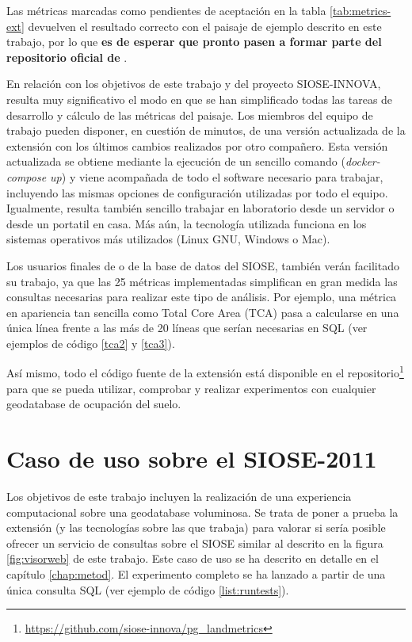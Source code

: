 Las métricas marcadas como pendientes de aceptación en la tabla \ref{tab:metrics-ext} devuelven el resultado correcto con el paisaje de ejemplo descrito en este trabajo, por lo que \textbf{es de esperar que pronto pasen a formar parte del repositorio oficial de \pgland{}}.

En relación con los objetivos de este trabajo y del proyecto SIOSE-INNOVA, resulta muy significativo el modo en que se han simplificado todas las tareas de desarrollo y cálculo de las métricas del paisaje. Los miembros del equipo de trabajo pueden disponer, en cuestión de minutos, de una versión actualizada de la extensión \pgland{} con los últimos cambios realizados por otro compañero. Esta versión actualizada se obtiene mediante la ejecución de un sencillo comando (\textit{docker-compose up}) y viene acompañada de todo el software necesario para trabajar, incluyendo las mismas opciones de configuración utilizadas por todo el equipo. Igualmente, resulta también sencillo trabajar en laboratorio desde un servidor o desde un portatil en casa. Más aún, la tecnología utilizada funciona en los sistemas operativos más utilizados (Linux GNU, Windows o Mac). 

Los usuarios finales de \pgland{} o de la base de datos del SIOSE, también verán facilitado su trabajo, ya que las 25 métricas implementadas simplifican en gran medida las consultas necesarias para realizar este tipo de análisis. Por ejemplo, una métrica en apariencia tan sencilla como Total Core Area (TCA) pasa a calcularse en una única línea frente a las más de 20 líneas que serían necesarias en SQL (ver ejemplos de código \ref{tca2} y \ref{tca3}).

Así mismo, todo el código fuente de la extensión \pgland{} está disponible en el repositorio\footnote{\url{https://github.com/siose-innova/pg_landmetrics}} para que se pueda utilizar, comprobar y realizar experimentos con cualquier geodatabase de ocupación del suelo.

\section{Caso de uso sobre el SIOSE-2011 \label{sec:caso_uso}}

Los objetivos de este trabajo incluyen la realización de una experiencia computacional sobre una geodatabase voluminosa. Se trata de poner a prueba la extensión \pgland{} (y las tecnologías sobre las que trabaja) para valorar si sería posible ofrecer un servicio de consultas sobre el SIOSE similar al descrito en la figura \ref{fig:visorweb} de este trabajo. Este caso de uso se ha descrito en detalle en el capítulo \ref{chap:metod}. El experimento completo se ha lanzado a partir de una única consulta SQL (ver ejemplo de código \ref{list:runtests}).

